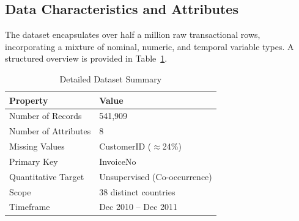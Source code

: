 \documentclass[conference]{IEEEtran}
\begin{document}
\subsection{Data Characteristics and Attributes}
The dataset encapsulates over half a million raw transactional rows, incorporating a mixture of nominal, numeric, and temporal variable types. A structured overview is provided in Table~\ref{tab:dataset_summary}.

\begin{table}[htbp]
\caption{Detailed Dataset Summary}
\begin{center}
\renewcommand{\arraystretch}{1.2}
\begin{tabular}{@{}ll@{}}
\toprule
\textbf{Property} & \textbf{Value} \\
\midrule
Number of Records & 541,909 \\
Number of Attributes & 8 \\
Missing Values & CustomerID ($\approx$24\%) \\
Primary Key & InvoiceNo \\
Quantitative Target & Unsupervised (Co-occurrence) \\
Scope & 38 distinct countries \\
Timeframe & Dec 2010 -- Dec 2011 \\
\bottomrule
\end{tabular}
\label{tab:dataset_summary}
\end{center}
\end{table}
\end{document}
